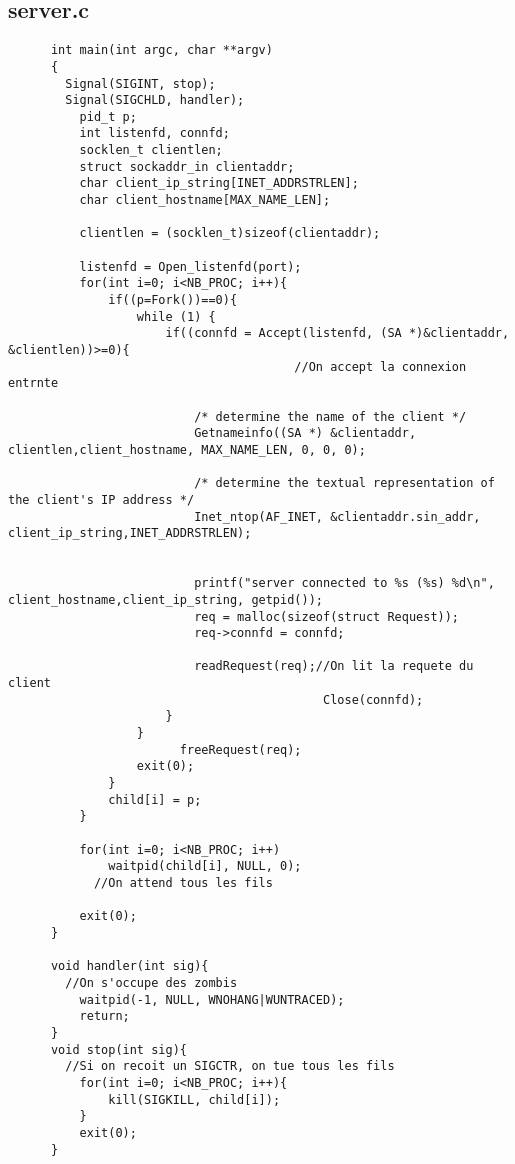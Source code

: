 \documentclass{report}
\begin{document}
      \subsection{server.c}
      \begin{lstlisting}
      int main(int argc, char **argv)
      {
      	Signal(SIGINT, stop);
      	Signal(SIGCHLD, handler);
          pid_t p;
          int listenfd, connfd;
          socklen_t clientlen;
          struct sockaddr_in clientaddr;
          char client_ip_string[INET_ADDRSTRLEN];
          char client_hostname[MAX_NAME_LEN];

          clientlen = (socklen_t)sizeof(clientaddr);

          listenfd = Open_listenfd(port);
          for(int i=0; i<NB_PROC; i++){
              if((p=Fork())==0){
                  while (1) {
                      if((connfd = Accept(listenfd, (SA *)&clientaddr, &clientlen))>=0){
      									//On accept la connexion entrnte

                          /* determine the name of the client */
                          Getnameinfo((SA *) &clientaddr, clientlen,client_hostname, MAX_NAME_LEN, 0, 0, 0);

                          /* determine the textual representation of the client's IP address */
                          Inet_ntop(AF_INET, &clientaddr.sin_addr, client_ip_string,INET_ADDRSTRLEN);


                          printf("server connected to %s (%s) %d\n", client_hostname,client_ip_string, getpid());
                          req = malloc(sizeof(struct Request));
                          req->connfd = connfd;

                          readRequest(req);//On lit la requete du client
      										Close(connfd);
                      }
                  }
          				freeRequest(req);
                  exit(0);
              }
              child[i] = p;
          }

          for(int i=0; i<NB_PROC; i++)
              waitpid(child[i], NULL, 0);
      		//On attend tous les fils

          exit(0);
      }

      void handler(int sig){
      	//On s'occupe des zombis
          waitpid(-1, NULL, WNOHANG|WUNTRACED);
          return;
      }
      void stop(int sig){
      	//Si on recoit un SIGCTR, on tue tous les fils
          for(int i=0; i<NB_PROC; i++){
              kill(SIGKILL, child[i]);
          }
          exit(0);
      }


\end{lstlisting}
\end{document}
